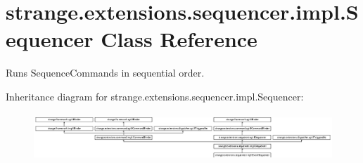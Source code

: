 \hypertarget{classstrange_1_1extensions_1_1sequencer_1_1impl_1_1_sequencer}{\section{strange.\-extensions.\-sequencer.\-impl.\-Sequencer Class Reference}
\label{classstrange_1_1extensions_1_1sequencer_1_1impl_1_1_sequencer}
}


Runs Sequence\-Commands in sequential order.  


Inheritance diagram for strange.\-extensions.\-sequencer.\-impl.\-Sequencer\-:\begin{figure}[H]
\begin{center}
\leavevmode
\includegraphics[height=1.800643cm]{classstrange_1_1extensions_1_1sequencer_1_1impl_1_1_sequencer}
\end{center}
\end{figure}
